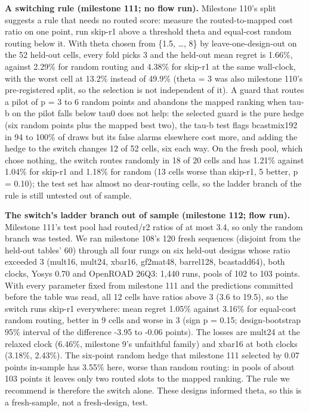 \documentclass[conference]{IEEEtran}
\begin{document}
\textbf{A switching rule (milestone 111; no flow run).} Milestone 110's
split suggests a rule that needs no routed score: measure the
routed-to-mapped cost ratio on one point, run skip-r1 above a threshold
theta and equal-cost random routing below it. With theta chosen from
\{1.5, \ldots, 8\} by leave-one-design-out on the 52 held-out cells,
every fold picks 3 and the held-out mean regret is 1.66\%, against
2.29\% for random routing and 4.38\% for skip-r1 at the same wall-clock,
with the worst cell at 13.2\% instead of 49.9\% (theta = 3 was also
milestone 110's pre-registered split, so the selection is not
independent of it). A guard that routes a pilot of p = 3 to 6 random
points and abandons the mapped ranking when tau-b on the pilot falls
below tau0 does not help: the selected guard is the pure hedge (six
random points plus the mapped best two), the tau-b test flags
bcastmix192 in 94 to 100\% of draws but its false alarms elsewhere cost
more, and adding the hedge to the switch changes 12 of 52 cells, six
each way. On the fresh pool, which chose nothing, the switch routes
randomly in 18 of 20 cells and has 1.21\% against 1.04\% for skip-r1 and
1.18\% for random (13 cells worse than skip-r1, 5 better, p = 0.10); the
test set has almost no dear-routing cells, so the ladder branch of the
rule is still untested out of sample.

\textbf{The switch's ladder branch out of sample (milestone 112; flow
run).} Milestone 111's test pool had routed/r2 ratios of at most 3.4, so
only the random branch was tested. We ran milestone 108's 120 fresh
sequences (disjoint from the held-out tables' 60) through all four rungs
on six held-out designs whose ratio exceeded 3 (mult16, mult24, xbar16,
gf2mat48, barrel128, bcastadd64), both clocks, Yosys 0.70 and OpenROAD
26Q3: 1,440 runs, pools of 102 to 103 points. With every parameter fixed
from milestone 111 and the predictions committed before the table was
read, all 12 cells have ratios above 3 (3.6 to 19.5), so the switch runs
skip-r1 everywhere: mean regret 1.05\% against 3.16\% for equal-cost
random routing, better in 9 cells and worse in 3 (sign p = 0.15;
design-bootstrap 95\% interval of the difference -3.95 to -0.06 points).
The losses are mult24 at the relaxed clock (6.46\%, milestone 9's
unfaithful family) and xbar16 at both clocks (3.18\%, 2.43\%). The
six-point random hedge that milestone 111 selected by 0.07 points
in-sample has 3.55\% here, worse than random routing: in pools of about
103 points it leaves only two routed slots to the mapped ranking. The
rule we recommend is therefore the switch alone. These designs informed
theta, so this is a fresh-sample, not a fresh-design, test.
\end{document}
